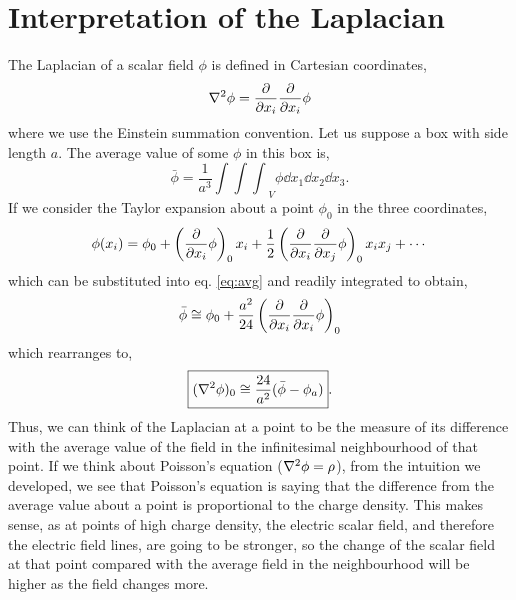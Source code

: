 \documentclass{book}
\begin{document}
\chapter{Interpretation of the Laplacian}
The Laplacian of a scalar field $\phi$ is defined in Cartesian coordinates,
\begin{equation}
	\laplacian{\phi} = \pdv{x_i}\pdv{x_i} \phi
\end{equation}
where we use the Einstein summation convention. Let us suppose a box with side length $a$. The average value of some $\phi$ in this box is,
\begin{equation}
	\bar{\phi} = \frac{1}{a^3}{\int\int\int}_V \phi \dd{x_1}\dd{x_2}\dd{x_3}. \label{eq:avg}
\end{equation}
If we consider the Taylor expansion about a point $\phi_0$ in the three coordinates, 
\begin{equation}
	\phi(x_i) = \phi_0 + \left(\pdv{x_i}\phi\right)_0x_i + \frac{1}{2}\left(\pdv{x_i}\pdv{x_j}\phi\right)_0x_ix_j + \cdots
\end{equation}
which can be substituted into eq. \eqref{eq:avg} and readily integrated to obtain,
\begin{equation}
	\bar{\phi} \cong \phi_0 + \frac{a^2}{24}\left(\pdv{x_i}\pdv{x_i}\phi\right)_0
\end{equation}
which rearranges to,
\begin{equation}
	\boxed{(\laplacian{\phi})_0 \cong \frac{24}{a^2}(\bar{\phi} - \phi_a)}.
\end{equation}
Thus, we can think of the Laplacian at a point to be the measure of its difference with the average value of the field in the infinitesimal neighbourhood of that point. If we think about Poisson's equation ($\laplacian{\phi} = \rho$), from the intuition we developed, we see that Poisson's equation is saying that the difference from the average value about a point is proportional to the charge density. This makes sense, as at points of high charge density, the electric scalar field, and therefore the electric field lines, are going to be stronger, so the change of the scalar field at that point compared with the average field in the neighbourhood will be higher as the field changes more.
\end{document}
